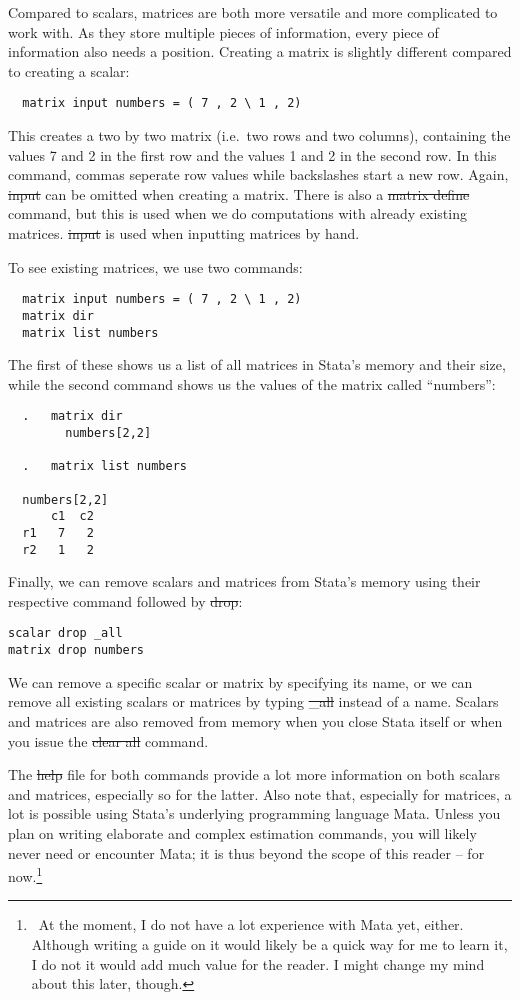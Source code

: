 Compared to scalars, matrices are both more versatile and more complicated to work with.
As they store multiple pieces of information, every piece of information also needs a position.
Creating a matrix is slightly different compared to creating a scalar:
\begin{verbatim}
  matrix input numbers = ( 7 , 2 \ 1 , 2)
\end{verbatim}
This creates a two by two matrix (i.e.\ two rows and two columns),
containing the values 7 and 2 in the first row and the values 1 and 2 in the second row.
In this command, commas seperate row values while backslashes start a new row.
Again, \st{input} can be omitted when creating a matrix.
There is also a \st{matrix define} command,
but this is used when we do computations with already existing matrices.
\st{input} is used when inputting matrices by hand.

To see existing matrices, we use two commands:
\begin{verbatim}
  matrix input numbers = ( 7 , 2 \ 1 , 2)
  matrix dir
  matrix list numbers
\end{verbatim}
The first of these shows us a list of all matrices in Stata's memory and their size,
while the second command shows us the values of the matrix called ``numbers'':
\small\begin{verbatim}
  .   matrix dir
        numbers[2,2]

  .   matrix list numbers

  numbers[2,2]
      c1  c2
  r1   7   2
  r2   1   2
\end{verbatim}\normalsize

Finally,
we can remove scalars and matrices from Stata's memory using their respective command followed by \st{drop}:
\begin{verbatim}
scalar drop _all
matrix drop numbers
\end{verbatim}
We can remove a specific scalar or matrix by specifying its name,
or we can remove all existing scalars or matrices by typing \st{_all} instead of a name.
Scalars and matrices are also removed from memory when you close Stata itself or when you issue the \st{clear all} command.

The \st{help} file for both commands provide a lot more information on both scalars and matrices, especially so for the latter.
Also note that, especially for matrices, a lot is possible using Stata's underlying programming language Mata.
Unless you plan on writing elaborate and complex estimation commands,
you will likely never need or encounter Mata;
it is thus beyond the scope of this reader -- for now.\footnote{~At the moment, I do not have a lot experience with Mata yet, either. Although writing a guide on it would likely be a quick way for me to learn it, I do not it would add much value for the reader. I might change my mind about this later, though.}


